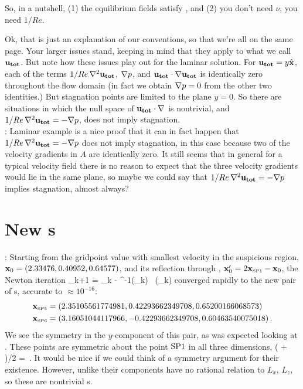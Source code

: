 So, in a nutshell, (1) the equilibrium fields satisfy , and
(2) you don't need $\nu$, you need $1/Re$.

Ok, that is just an explanation of our conventions, so that we're
all on the same page. Your larger issues stand, keeping in mind that
they apply to what we call ${\bf u_{tot}}$. But note how these issues play
out for the laminar solution. For ${\bf u_{tot}} = y \hat{\bf x}$, each of
the terms $1/Re \, {\nabla^{2}} {\bf u_{tot}}$, ${\bf \nabla} p$, and ${\bf u_{tot}} \cdot {\bf \nabla}
{\bf u_{tot}}$ is identically zero throughout the flow domain (in fact we
obtain ${\bf \nabla} p = 0$ from the other two identities.) But stagnation
points are limited to the plane $y=0$. So there are situations in
which the null space of ${\bf u_{tot}} \cdot {\bf \nabla}$ is nontrivial, and
$1/Re \, {\nabla^{2}} {\bf u_{tot}} = - {\bf \nabla} p$, does not imply stagnation. \\

 :
 Laminar example is a nice proof that it can in fact happen that
 $1/Re \, {\nabla^{2}} {\bf u_{tot}} = - {\bf \nabla} p$ does not imply stagnation, in this
 case because two of the velocity gradients in $A$ are identically
 zero. It still seems that in general for a typical velocity field
 there is no reason to expect that the three velocity gradients
 would lie in the same plane, so maybe we could say that
 $1/Re \, {\nabla^{2}} {\bf u_{tot}} = - {\bf \nabla} p$ implies stagnation, almost
 always?

\section{New \stagp s}
\label{sec:newstagps}

: Starting from the gridpoint value
 with smallest velocity in the suspicious region,
${\bf x}_{0} =(2.33476, 0.40952, 0.64577)$, and its reflection through
, ${\bf x}_{0}' =2 {{\bf x}_{\text{\tiny SP1}}} - {\bf x}_{0}$, the Newton iteration
 \beq
 \bx_{k+1} = \bx_{k} -
          {\Mvar}^{-1}(\bx_{k}) \, \bu(\bx_{k})
 \eeq
converged rapidly to the new pair of \stagp s, accurate to
$\approx 10^{-16}$:
\begin{align}
&{{\bf x}_{\text{\tiny SP5}}} =(2.35105561774981,0.42293662349708,0.65200166068573)
\\
&{{\bf x}_{\text{\tiny SP6}}}=(3.16051044117966,-0.42293662349708,0.60463540075018)
\label{eqn:newspNewt}
\,.
\end{align}
We see the
 symmetry in the $y$-component of this pair, as was expected looking
 at .
These points are
 symmetric about the point ${{\text{SP1}}}$ in all three dimensions,
 \beq
    ( + )/2 = 
 \,.
 \eeq
It would
 be nice if we could think of a symmetry argument for their
 existence. However,
 unlike  their components have no rational
 relation to $L_x$, $L_z$,
 so these are nontrivial \stagp s.

